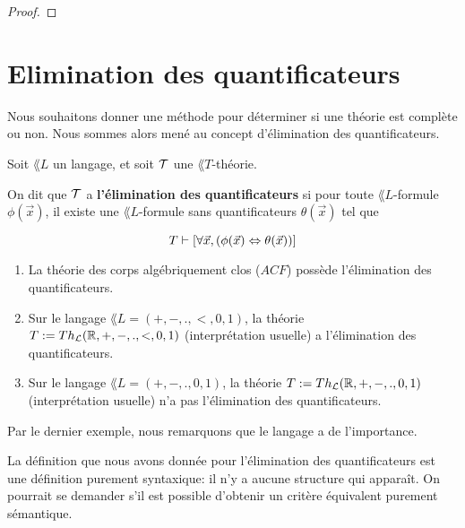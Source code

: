 \documentclass[a4paper, 12pt]{report}
\begin{document}
\ifdefined\outputproof
\begin{proof}

\end{proof}
\fi

\chapter{Elimination des quantificateurs}

Nous souhaitons donner une méthode pour déterminer si une théorie est complète
ou non. Nous sommes alors mené au concept d'élimination des quantificateurs.

\begin{definition}
	\label{definition:elimination_quantificateurs}
	Soit $\lang{L}$ un langage, et soit $\mathcal{T}$ une $\lang{T}$-théorie.

	On dit que $\mathcal{T}$ a \textbf{l'élimination des quantificateurs} si
	pour toute $\lang{L}$-formule $\phi(\vec{x})$, il existe une
	$\lang{L}$-formule sans quantificateurs $\theta(\vec{x})$ tel que

	\begin{equation}
		T \vdash [\forall \vec{x}, (\phi(\vec{x}) \Leftrightarrow \theta(\vec{x}))]
	\end{equation}
\end{definition}

\begin{exemple}
	\begin{enumerate}
		\item La théorie des corps algébriquement clos ($ACF$) possède l'élimination des
	quantificateurs.
		\item Sur le langage $\lang{L} = (+, -, ., <, 0, 1)$, la théorie $T :=
			Th_{\mathcal{L}}(\mathbb{R}, +, -, ., <, 0, 1)$ (interprétation usuelle) a
			l'élimination des quantificateurs.
		\item Sur le langage $\lang{L} = (+, -, ., 0, 1)$, la théorie $T :=
			Th_{\mathcal{L}}(\mathbb{R}, +, -, ., 0, 1)$ (interprétation usuelle) n'a pas
			l'élimination des quantificateurs.
	\end{enumerate}
\end{exemple}

Par le dernier exemple, nous remarquons que le langage a de l'importance.

La définition que nous avons donnée pour l'élimination des quantificateurs est
une définition purement syntaxique: il n'y a aucune structure qui apparaît.
On pourrait se demander s'il est possible d'obtenir un critère équivalent
purement sémantique.
\end{document}
